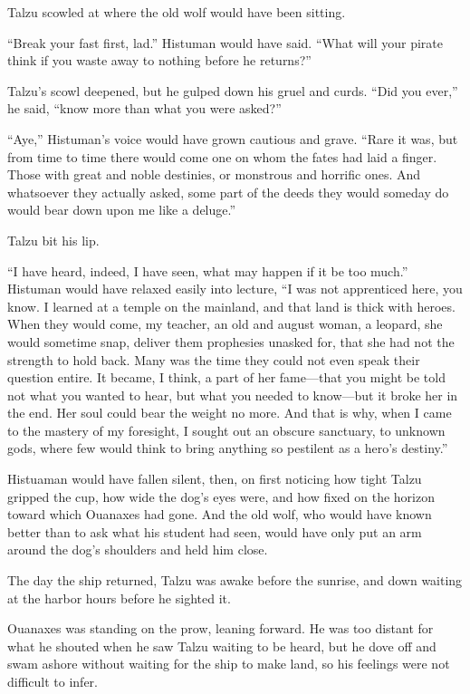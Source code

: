 Talzu scowled at where the old wolf would have been sitting.

``Break your fast first, lad.'' Histuman would have said. ``What will your pirate think if you waste away to nothing before he returns?''

Talzu's scowl deepened, but he gulped down his gruel and curds. ``Did you ever,'' he said, ``know more than what you were asked?''

``Aye,'' Histuman's voice would have grown cautious and grave. ``Rare it was, but from time to time there would come one on whom the fates had laid a finger. Those with great and noble destinies, or monstrous and horrific ones. And whatsoever they actually asked, some part of the deeds they would someday do would bear down upon me like a deluge.''

Talzu bit his lip.

``I have heard, indeed, I have seen, what may happen if it be too much.'' Histuman would have relaxed easily into lecture, ``I was not apprenticed here, you know. I learned at a temple on the mainland, and that land is thick with heroes. When they would come, my teacher, an old and august woman, a leopard, she would sometime snap, deliver them prophesies unasked for, that she had not the strength to hold back. Many was the time they could not even speak their question entire. It became, I think, a part of her fame---that you might be told not what you wanted to hear, but what you needed to know---but it broke her in the end. Her soul could bear the weight no more. And that is why, when I came to the mastery of my foresight, I sought out an obscure sanctuary, to unknown gods, where few would think to bring anything so pestilent as a hero's destiny.''

Histuaman would have fallen silent, then, on first noticing how tight Talzu gripped the cup, how wide the dog's eyes were, and how fixed on the horizon toward which Ouanaxes had gone. And the old wolf, who would have known better than to ask what his student had seen, would have only put an arm around the dog's shoulders and held him close.

\secdiv

\noindent The day the ship returned, Talzu was awake before the sunrise, and down waiting at the harbor hours before he sighted it.

Ouanaxes was standing on the prow, leaning forward. He was too distant for what he shouted when he saw Talzu waiting to be heard, but he dove off and swam ashore without waiting for the ship to make land, so his feelings were not difficult to infer.

